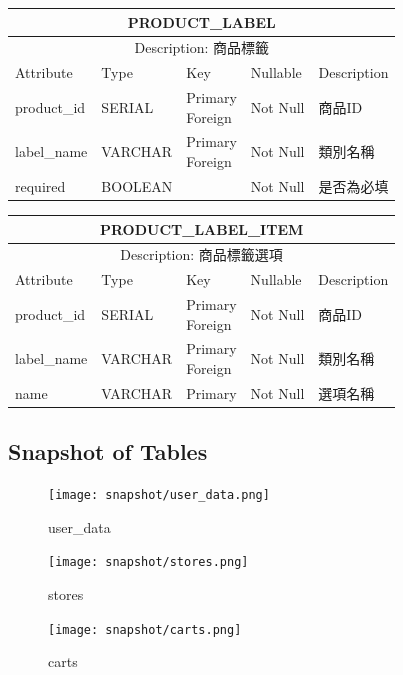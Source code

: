 \documentclass[a4paper, 12pt]{article}
\begin{document}
\noindent\begin{tabular}{ | p{7em} | p{5.5em} | p{5.5em} | p{4.5em} | p{11em} |}
  \hline
  \multicolumn{5}{|c|}{PRODUCT_LABEL} \tabularnewline
  \hline 
  \multicolumn{5}{|c|}{Description: 商品標籤} \tabularnewline
  \hline 
  Attribute & Type & Key & Nullable & Description \\
  \hline
  product_id & SERIAL & \makecell[l]{Primary \\ Foreign} & Not Null & 商品ID \\
  \hline
  label_name & VARCHAR & \makecell[l]{Primary \\ Foreign} & Not Null & 類別名稱 \\
  \hline
  required & BOOLEAN & & Not Null & 是否為必填\\
  \hline
\end{tabular}

\noindent\begin{tabular}{ | p{7em} | p{5.5em} | p{5.5em} | p{4.5em} | p{11em} |}
  \hline
  \multicolumn{5}{|c|}{PRODUCT_LABEL_ITEM} \tabularnewline
  \hline 
  \multicolumn{5}{|c|}{Description: 商品標籤選項} \tabularnewline
  \hline 
  Attribute & Type & Key & Nullable & Description \\
  \hline
  product_id & SERIAL & \makecell[l]{Primary \\ Foreign} & Not Null & 商品ID \\
  \hline
  label_name & VARCHAR & \makecell[l]{Primary \\ Foreign} & Not Null & 類別名稱 \\
  \hline
  name & VARCHAR & Primary & Not Null & 選項名稱\\
  \hline
\end{tabular}

\newpage

\subsection{Snapshot of Tables}
\begin{figure}[hp]
    \centerline{\texttt{[image: snapshot/user\_data.png]}}
    \caption{user_data}
\end{figure}


\begin{figure}[hp]
    \centerline{\texttt{[image: snapshot/stores.png]}}
    \caption{stores}
\end{figure}

\begin{figure}[hp]
    \centerline{\texttt{[image: snapshot/carts.png]}}
    \caption{carts}
\end{figure}
\end{document}
